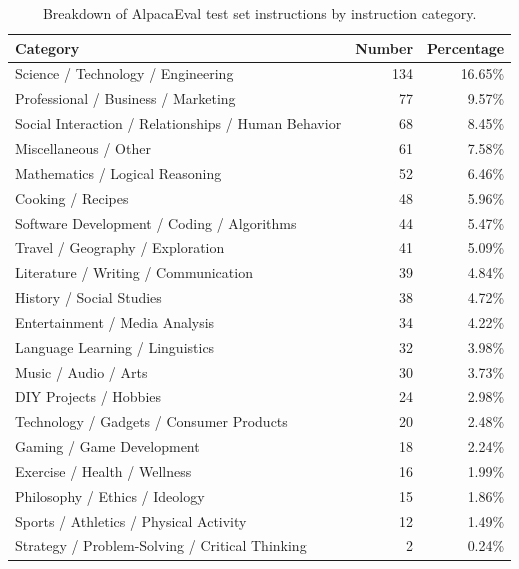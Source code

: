 \documentclass{article}
\begin{document}
\begin{table}[t]
\centering
   \caption{
   \label{tab:instruction_category_breakdown} Breakdown of AlpacaEval test set instructions by instruction category.
   }
\begin{tabular}{lrr}
\toprule
\textbf{Category}     & \textbf{Number} & \textbf{Percentage}  \\
\midrule
Science / Technology / Engineering                  & 134    & 16.65\%    \\
Professional / Business / Marketing                 & 77     & 9.57\%      \\
Social Interaction / Relationships / Human Behavior & 68     & 8.45\%      \\
Miscellaneous / Other                               & 61     & 7.58\%      \\
Mathematics / Logical Reasoning                     & 52     & 6.46\%      \\
Cooking / Recipes                                   & 48     & 5.96\%      \\
Software Development / Coding / Algorithms          & 44     & 5.47\%      \\
Travel / Geography / Exploration                    & 41     & 5.09\%      \\
Literature / Writing / Communication                & 39     & 4.84\%      \\
History / Social Studies                            & 38     & 4.72\%      \\
Entertainment / Media Analysis                      & 34     & 4.22\%      \\
Language Learning / Linguistics                     & 32     & 3.98\%      \\
Music / Audio / Arts                                & 30     & 3.73\%      \\
DIY Projects / Hobbies                              & 24     & 2.98\%      \\
Technology / Gadgets / Consumer Products            & 20     & 2.48\%      \\
Gaming / Game Development                           & 18     & 2.24\%      \\
Exercise / Health / Wellness                        & 16     & 1.99\%      \\
Philosophy / Ethics / Ideology                      & 15     & 1.86\%      \\
Sports / Athletics / Physical Activity              & 12     & 1.49\%      \\
Strategy / Problem-Solving / Critical Thinking      & 2      & 0.24\%      \\
\bottomrule
\end{tabular}
\end{table}
\end{document}
